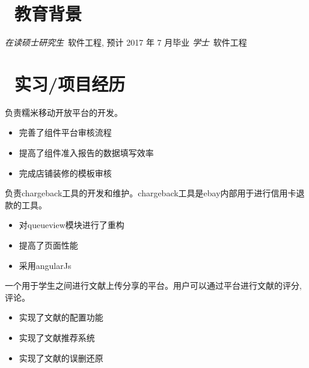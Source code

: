 \documentclass{resume}
\begin{document}



\section{\faGraduationCap\  教育背景}
\textit{在读硕士研究生}\ 软件工程, 预计 2017 年 7 月毕业
\textit{学士}\ 软件工程

\section{\faUsers\ 实习/项目经历}

负责糯米移动开放平台的开发。
\begin{itemize}
  \item 完善了组件平台审核流程
  \item 提高了组件准入报告的数据填写效率
  \item 完成店铺装修的模板审核
\end{itemize}

负责chargeback工具的开发和维护。chargeback工具是ebay内部用于进行信用卡退款的工具。
\begin{itemize}
  \item 对queueview模块进行了重构
  \item 提高了页面性能
  \item 采用angularJs
\end{itemize}

\begin{onehalfspacing}
一个用于学生之间进行文献上传分享的平台。用户可以通过平台进行文献的评分,评论。
\begin{itemize}
  \item 实现了文献的配置功能
  \item 实现了文献推荐系统
  \item 实现了文献的误删还原
\end{itemize}
\end{onehalfspacing}
\end{document}
